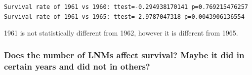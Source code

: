 \documentclass[11pt]{article}
\begin{document}
    \begin{Verbatim}[commandchars=\\\{\}]
Survival rate of 1961 vs 1960: ttest=-0.294938170141 p=0.769215476257
Survival rate of 1961 vs 1965: ttest=-2.9787047318 p=0.0043906136554

    \end{Verbatim}

    1961 is not statistically different from 1962, however it is different
from 1965.

    \hypertarget{does-the-number-of-lnms-affect-survival-maybe-it-did-in-certain-years-and-did-not-in-others}{%
\subsubsection{Does the number of LNMs affect survival? Maybe it did in
certain years and did not in
others?}\label{does-the-number-of-lnms-affect-survival-maybe-it-did-in-certain-years-and-did-not-in-others}}
\end{document}
